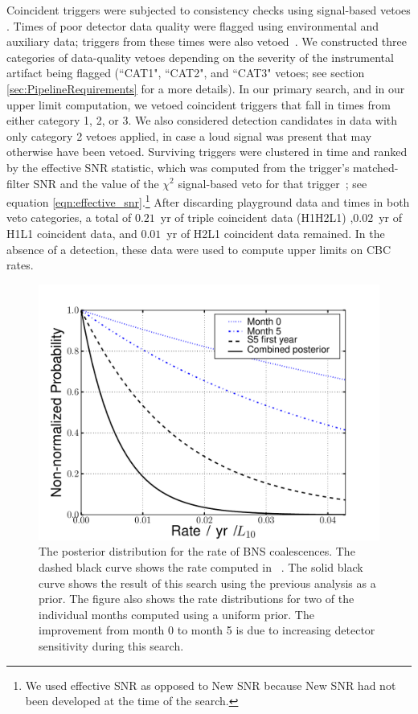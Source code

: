 Coincident triggers were subjected to consistency checks using signal-based
vetoes \cite{LIGOS3S4Tuning,Allen:2004,Rodriguez:2007}. Times of poor detector
data quality were flagged using environmental and auxiliary data; triggers from
these times were also vetoed~\cite{Collaboration:2009tt}. We constructed three
categories of data-quality vetoes depending on the severity of the instrumental
artifact being flagged (``CAT1", ``CAT2", and ``CAT3" vetoes; see section
\ref{sec:PipelineRequirements} for a more details). In our primary search, and
in our upper limit computation, we vetoed coincident triggers that fall in
times from either category 1, 2, or 3. We also considered detection candidates
in data with only category 2 vetoes applied, in case a loud signal was present
that may otherwise have been vetoed.  Surviving triggers were clustered in time
and ranked by the effective \ac{SNR} statistic, which was computed from the
trigger's matched-filter \ac{SNR} and the value of the $\chi^2$ signal-based
veto for that trigger~\cite{LIGOS3S4all}; see equation
\ref{eqn:effective_snr}.\footnote{We used effective \ac{SNR} as opposed to New
\ac{SNR} because New \ac{SNR} had not been developed at the time of the
search.} After discarding playground data and times in both veto categories, a
total of $0.21$~yr of triple coincident data (H1H2L1) ,$0.02$~yr of H1L1
coincident data, and $0.01$~yr of H2L1 coincident data remained. In the absence
of a detection, these data were used to compute upper limits on \ac{CBC} rates.

\begin{figure}
\center
\includegraphics[width=6in]{figures/S5_lowmass_18_month_combined_bns_nonspin-posterior-comparison}
\caption{The posterior distribution for the rate of BNS coalescences. The
dashed black curve shows the rate computed in ~\cite{Collaboration:2009tt}.
The solid black curve shows the result of this search using the previous
analysis as a prior. The figure also shows the rate distributions for two of
the  individual months computed using a uniform prior. The improvement from
month 0 to month 5 is due to increasing detector sensitivity during this
search.  }  
   \label{fig:ul}
\end{figure}

